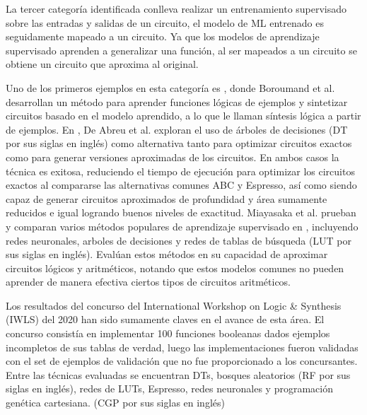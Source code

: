 La tercer categoría identificada conlleva realizar un entrenamiento supervisado
sobre las entradas y salidas de un circuito, el modelo de ML entrenado es
seguidamente mapeado a un circuito. Ya que los modelos de aprendizaje
supervisado aprenden a generalizar una función, al ser mapeados a un circuito
se obtiene un circuito que aproxima al original.

Uno de los primeros ejemplos en esta categoría es
\cite{boroumand_learning_2021}, donde Boroumand et al. desarrollan un método
para aprender funciones lógicas de ejemplos y sintetizar circuitos basado en el
modelo aprendido, a lo que le llaman síntesis lógica a partir de ejemplos. En
\cite{de_abreu_fast_2021}, De Abreu et al. exploran el uso de árboles de
decisiones (DT por sus siglas en inglés) como alternativa tanto para optimizar
circuitos exactos como para generar versiones aproximadas de los circuitos. En
ambos casos la técnica es exitosa, reduciendo el tiempo de ejecución para
optimizar los circuitos exactos al compararse las alternativas comunes ABC y
Espresso, así como siendo capaz de generar circuitos aproximados de profundidad
y área sumamente reducidos e igual logrando buenos niveles de exactitud.
Miayasaka et al. prueban y comparan varios métodos populares de aprendizaje
supervisado en \cite{miyasaka_logic_2021}, incluyendo redes neuronales, arboles
de decisiones y redes de tablas de búsqueda (LUT por sus siglas en inglés).
Evalúan estos métodos en su capacidad de aproximar circuitos lógicos y
aritméticos, notando que estos modelos comunes no pueden aprender de manera
efectiva ciertos tipos de circuitos aritméticos.

Los resultados del concurso del International Workshop on Logic \& Synthesis
(IWLS) del 2020 \cite{rai_logic_2021} han sido sumamente claves en el avance de
esta área. El concurso consistía en implementar 100 funciones booleanas dados
ejemplos incompletos de sus tablas de verdad, luego las implementaciones fueron
validadas con el set de ejemplos de validación que no fue proporcionado a los
concursantes. Entre las técnicas evaluadas se encuentran DTs, bosques
aleatorios (RF por sus siglas en inglés), redes de LUTs, Espresso, redes
neuronales y programación genética cartesiana. (CGP por sus siglas en inglés)


